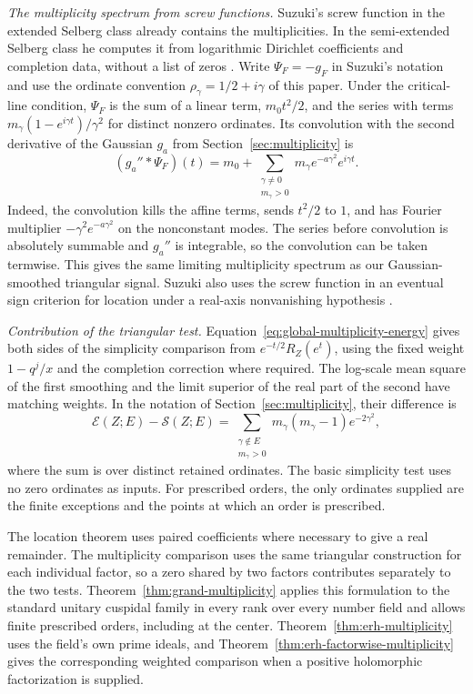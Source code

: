 \documentclass[11pt]{amsart}
\theoremstyle{definition}
\theoremstyle{remark}
\numberwithin{equation}{section}
\begin{document}
\emph{The multiplicity spectrum from screw functions.}
Suzuki's screw function in the extended Selberg class already
contains the multiplicities. In the semi-extended Selberg class
he computes it from logarithmic Dirichlet coefficients and
completion data, without a list of zeros
\cite[Eq.~(1.1) and Theorem~4.1]{SuzukiSelbergScrew}.
Write \(\Psi_F=-g_F\) in Suzuki's notation and use the ordinate
convention \(\rho_\gamma=1/2+i\gamma\) of this paper. Under the
critical-line condition, \(\Psi_F\) is the sum of a linear term,
\(m_0t^2/2\), and the series with terms
\(m_\gamma(1-e^{i\gamma t})/\gamma^2\) for distinct nonzero
ordinates. Its convolution with the second derivative of the
Gaussian \(g_a\) from Section~\ref{sec:multiplicity} is
\[
 (g_a''*\Psi_F)(t)
 = m_0+\sum_{\substack{\gamma\ne0\\m_\gamma>0}}
           m_\gamma e^{-a\gamma^2}e^{i\gamma t}.
\]
Indeed, the convolution kills the affine terms, sends \(t^2/2\)
to \(1\), and has Fourier multiplier \(-\gamma^2e^{-a\gamma^2}\)
on the nonconstant modes. The series before convolution is
absolutely summable and \(g_a''\) is integrable, so the convolution
can be taken termwise. This gives the same limiting multiplicity
spectrum as our Gaussian-smoothed triangular signal. Suzuki also
uses the screw function in an eventual sign criterion for location
under a real-axis nonvanishing hypothesis
\cite[Theorem~1.1]{SuzukiSelbergScrew}.

\emph{Contribution of the triangular test.}
Equation~\eqref{eq:global-multiplicity-energy} gives both sides of
the simplicity comparison from \(e^{-t/2}R_Z(e^t)\), using the fixed
weight \(1-q^j/x\) and the completion correction where required.
The log-scale mean square of the first smoothing and the limit
superior of the real part of the second have matching weights.
In the notation of Section~\ref{sec:multiplicity}, their difference is
\[
 \mathcal E(Z;E)-\mathcal S(Z;E)
 =\sum_{\substack{\gamma\notin E\\m_\gamma>0}}
     m_\gamma(m_\gamma-1)e^{-2\gamma^2},
\]
where the sum is over distinct retained ordinates. The basic
simplicity test uses no zero ordinates as inputs.
For prescribed orders, the only ordinates supplied are the finite
exceptions and the points at which an order is prescribed.

The location theorem uses paired coefficients where necessary
to give a real remainder. The multiplicity comparison uses the
same triangular construction for each individual factor, so a
zero shared by two factors contributes separately to the two
tests. Theorem~\ref{thm:grand-multiplicity} applies this formulation
to the standard unitary cuspidal family in every rank over every
number field and allows finite prescribed orders, including at
the center. Theorem~\ref{thm:erh-multiplicity} uses the field's own
prime ideals, and Theorem~\ref{thm:erh-factorwise-multiplicity}
gives the corresponding weighted comparison when a positive
holomorphic factorization is supplied.
\end{document}
